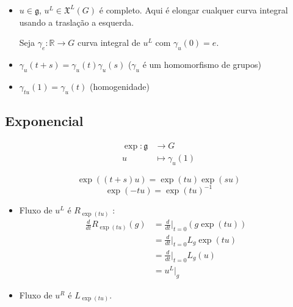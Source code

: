 \begin{exercise}\leavevmode 
	\begin{itemize}
	\item $u\in\mathfrak{g}$, $u^L\in\mathfrak{X}^L(G)$ \'e completo. Aqui \'e elongar cualquer curva integral usando a trasla\c c\~ao a esquerda.

	Seja $\gamma_e:\mathbb{R}\to G$ curva integral de $u^L$ com  $\gamma_u(0)=e$. 

	\item $\gamma_u(t+s)=\gamma_u(t)\gamma_u(s)$ ($\gamma_u$  \'e um homomorfismo de grupos)

	\item $\gamma_{tu}(1)=\gamma_{u}(t)$ (homogenidade)
	\end{itemize}
\end{exercise}


\subsection{Exponencial}

\begin{defn}
	\begin{align*}
		\operatorname{exp}:\mathfrak{g}  &\longrightarrow G \\
		u &\longmapsto \gamma_u(1)
	\end{align*}
\end{defn}

\begin{remark}
\[\operatorname{exp}((t+s) u)=\operatorname{exp}(tu) \operatorname{exp}(su) \]
\[\operatorname{exp}(-tu) =\operatorname{exp}(tu)^{-1}\]
\end{remark}

\begin{remark}\leavevmode 
	\begin{itemize}
	\item Fluxo de $u^L$ \'e $R_{\operatorname{exp}(tu)}$ :
		\begin{align*}
			\frac{d}{dt}R_{\operatorname{exp}(tu)}(g)&=\frac{d}{dt}\Big|_{t=0}(g\operatorname{exp}(tu) )\\
			&=\frac{d}{dt}\Big|_{t=0}L_g\operatorname{exp}(tu)\\
			 &=\frac{d}{dt}|_{t=0}L_g(u)\\
			 &=u^L|_{g}
		\end{align*}
	\item Fluxo de $u^R$ \'e $L_{\operatorname{exp}(tu)}$.
	\end{itemize}
\end{remark}

